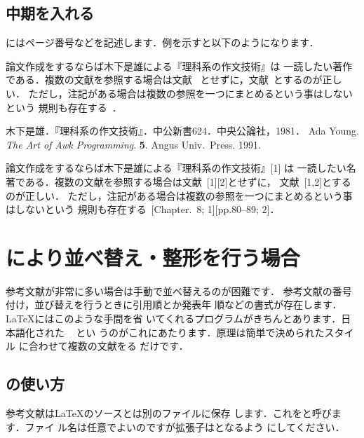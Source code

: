 \subsection{中期を入れる}
にはページ番号などを記述します．例を示すと以下のようになります．

\begin{intext}
論文作成をするならば木下是雄による『理科系の作文技術』\cite{KK1981}は
一読したい著作である．複数の文献を参照する場合は文献~\cite{KK1981}
\cite{AY1991}とせずに，文献~\cite{KK1981,AY1991}とするのが正しい．
ただし，注記がある場合は複数の参照を一つにまとめるという事はしないという
規則も存在する~\cite[Chapter.~8]{KK1981}\cite[pp.80--89]{AY1991}．
\begin{thebibliography}{9}
	木下是雄．『理科系の作文技術』．中公新書624．中央公論社，1981．
 Ada Young. \emph{The Art of Awk Programming}. 
      \textbf{5}. Angus Univ.~Press. 1991.
\end{thebibliography}
\end{intext}


\begin{outonly}
%
論文作成をするならば{木下是雄}による『理科系の{作文技術}』[1] は
一読したい名著である．複数の文献を参照する場合は文献~[1][2]とせずに，
文献~[1,2]とするのが正しい．
ただし，注記がある場合は複数の参照を一つにまとめるという事はしないという
規則も存在する~[Chapter.~8; 1][pp.80--89; 2]．
\end{outonly}


\section{\JBibTeX により並べ替え・整形を行う場合}


参考文献が非常に多い場合は手動で並べ替えるのが困難です．
参考文献の番号付け，並び替えを行うときに引用順とか発表年
順などの書式が存在します．{\LaTeX}にはこのような手間を省
いてくれるプログラムがきちんとあります．日本語化された
\Prog[JBibTeX]{\JBibTeX}~\cite{omjbibtex,omjbtxdoc} とい
うのがこれにあたります．原理は簡単で決められたスタイル
に合わせて複数の文献をる
だけです．

\subsection{\protect\JBibTeX の使い方}

参考文献は{\LaTeX}のソースとは別のファイルに保存
します．これをと呼びます．ファイ
ル名は任意でよいのですが拡張子は{}となるよう
にしてください．

